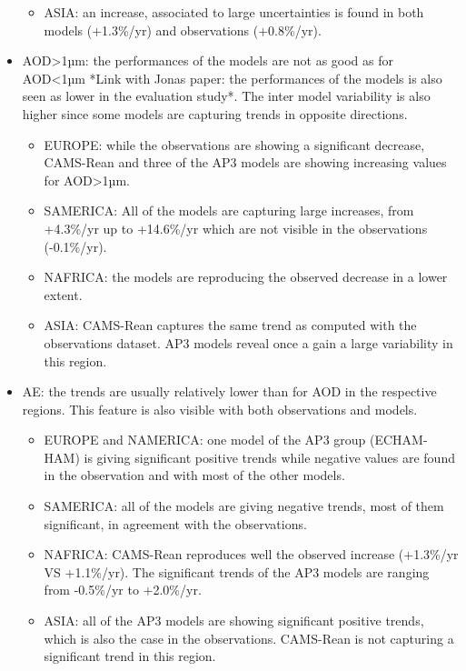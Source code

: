 \documentclass[journal abbreviation, manuscript]{copernicus}
\begin{document}
\begin{itemize}
\begin{itemize}
        \item ASIA: an increase, associated to large uncertainties is found in both models (+1.3\%/yr) and observations (+0.8\%/yr).
       \end{itemize}
 \item AOD>1µm: the performances of the models are not as good as for AOD<1µm *Link with Jonas paper: the performances of the models is also seen as lower in the evaluation study*. The inter model variability is also higher since some models are capturing trends in opposite directions.
       \begin{itemize}
        \item EUROPE: while the observations are showing a significant decrease, CAMS-Rean and three of the AP3 models are showing increasing values for AOD>1µm.
        \item SAMERICA: All of the models are capturing large increases, from +4.3\%/yr up to +14.6\%/yr  which are not visible in the observations (-0.1\%/yr). 
        \item NAFRICA: the models are reproducing the observed decrease in a lower extent. 
        \item ASIA: CAMS-Rean captures the same trend as computed with the observations dataset. AP3 models reveal once a gain a large variability in this region.
       \end{itemize}
 \item AE: the trends are usually relatively lower than for AOD in the respective regions. This feature is also visible with both observations and models.
       \begin{itemize}
        \item EUROPE and NAMERICA: one model of the AP3 group (ECHAM-HAM) is giving significant positive trends while negative values are found in the observation and with most of the other models.
        \item SAMERICA: all of the models are giving negative trends, most of them significant, in agreement with the observations.
        \item NAFRICA: CAMS-Rean reproduces well the observed increase (+1.3\%/yr VS +1.1\%/yr). The significant trends of the AP3 models are ranging from -0.5\%/yr to +2.0\%/yr.
        \item ASIA: all of the AP3 models are showing significant positive trends, which is also the case in the observations. CAMS-Rean is not capturing a significant trend in this region.
       \end{itemize}

\end{itemize}
\end{document}
